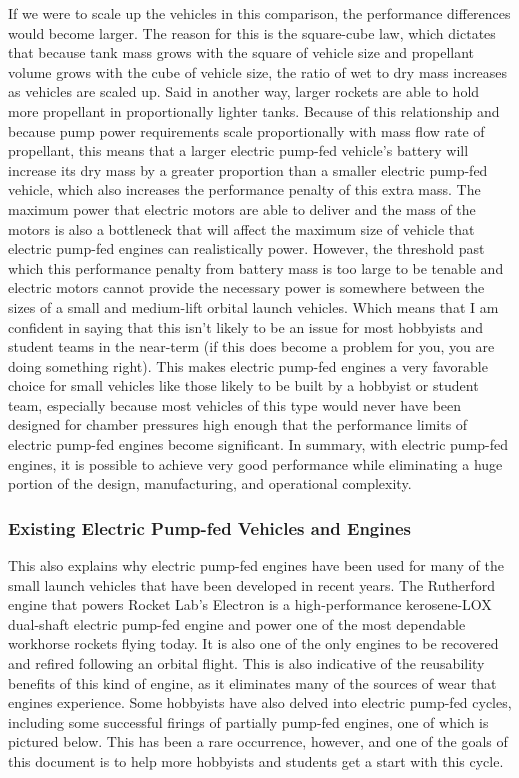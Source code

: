 \documentclass[12pt, letterpaper]{article}
\begin{document}
If we were to scale up the vehicles in this comparison, the performance differences would become larger. The reason for this is the square-cube law, which dictates that because tank mass grows with the square of vehicle size and propellant volume grows with the cube of vehicle size, the ratio of wet to dry mass increases as vehicles are scaled up. Said in another way, larger rockets are able to hold more propellant in proportionally lighter tanks. Because of this relationship and because pump power requirements scale proportionally with mass flow rate of propellant, this means that a larger electric pump-fed vehicle's battery will increase its dry mass by a greater proportion than a smaller electric pump-fed vehicle, which also increases the performance penalty of this extra mass. The maximum power that electric motors are able to deliver and the mass of the motors is also a bottleneck that will affect the maximum size of vehicle that electric pump-fed engines can realistically power. However, the threshold past which this performance penalty from battery mass is too large to be tenable and electric motors cannot provide the necessary power is somewhere between the sizes of a small and medium-lift orbital launch vehicles. Which means that I am confident in saying that this isn't likely to be an issue for most hobbyists and student teams in the near-term (if this does become a problem for you, you are doing something right). This makes electric pump-fed engines a very favorable choice for small vehicles like those likely to be built by a hobbyist or student team, especially because most vehicles of this type would never have been designed for chamber pressures high enough that the performance limits of electric pump-fed engines become significant. In summary, with electric pump-fed engines, it is possible to achieve very good performance while eliminating a huge portion of the design, manufacturing, and operational complexity.

\subsubsection{Existing Electric Pump-fed Vehicles and Engines}

This also explains why electric pump-fed engines have been used for many of the small launch vehicles that have been developed in recent years. The Rutherford engine that powers Rocket Lab's Electron is a high-performance kerosene-LOX dual-shaft electric pump-fed engine and power one of the most dependable workhorse rockets flying today. It is also one of the only engines to be recovered and refired following an orbital flight. This is also indicative of the reusability benefits of this kind of engine, as it eliminates many of the sources of wear that engines experience. Some hobbyists have also delved into electric pump-fed cycles, including some successful firings of partially pump-fed engines, one of which is pictured below. This has been a rare occurrence, however, and one of the goals of this document is to help more hobbyists and students get a start with this cycle.
\end{document}
